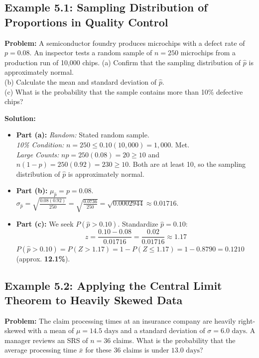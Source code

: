 \subsection*{Example 5.1: Sampling Distribution of Proportions in Quality Control}
\textbf{Problem:} A semiconductor foundry produces microchips with a defect rate of $p = 0.08$. An inspector tests a random sample of $n = 250$ microchips from a production run of 10,000 chips.
(a) Confirm that the sampling distribution of $\hat{p}$ is approximately normal.\\
(b) Calculate the mean and standard deviation of $\hat{p}$.\\
(c) What is the probability that the sample contains more than 10\% defective chips?

\textbf{Solution:}
\begin{itemize}[leftmargin=1.2em]
  \item \textbf{Part (a):}
  \textit{Random:} Stated random sample.\\
  \textit{10\% Condition:} $n = 250 \le 0.10(10,000) = 1,000$. Met.\\
  \textit{Large Counts:} $np = 250(0.08) = 20 \ge 10$ and $n(1-p) = 250(0.92) = 230 \ge 10$. Both are at least 10, so the sampling distribution of $\hat{p}$ is approximately normal.
  \item \textbf{Part (b):} $\mu_{\hat{p}} = p = \mathbf{0.08}$.\\
  $\sigma_{\hat{p}} = \sqrt{\frac{0.08(0.92)}{250}} = \sqrt{\frac{0.0736}{250}} = \sqrt{0.0002944} \approx \mathbf{0.01716}$.
  \item \textbf{Part (c):} We seek $P(\hat{p} > 0.10)$. Standardize $\hat{p} = 0.10$:
  \[ z = \frac{0.10 - 0.08}{0.01716} = \frac{0.02}{0.01716} \approx 1.17 \]
  $P(\hat{p} > 0.10) = P(Z > 1.17) = 1 - P(Z \le 1.17) = 1 - 0.8790 = \mathbf{0.1210}$ (approx. \textbf{12.1\%}).
\end{itemize}

\subsection*{Example 5.2: Applying the Central Limit Theorem to Heavily Skewed Data}
\textbf{Problem:} The claim processing times at an insurance company are heavily right-skewed with a mean of $\mu = 14.5\text{ days}$ and a standard deviation of $\sigma = 6.0\text{ days}$. A manager reviews an SRS of $n = 36$ claims.
What is the probability that the average processing time $\bar{x}$ for these 36 claims is under $13.0\text{ days}$?

